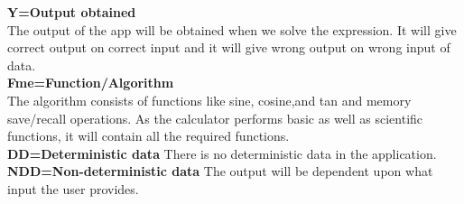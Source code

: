 \documentclass[a4paper,12pt]{article}
\begin{document}
\textbf{Y=Output obtained}\\

  The output of the app will be obtained when we solve the expression. It will give correct output on correct input and it will give wrong output on wrong input of data.
 \\

\textbf{Fme=Function/Algorithm}\\

The algorithm consists of functions like sine, cosine,and tan and memory save/recall operations. As the calculator performs basic as well as scientific functions, it will contain all the required functions.
\\

\textbf{DD=Deterministic data}
There is no deterministic data in the application.
\\

\textbf{NDD=Non-deterministic data}
The output will be dependent upon what input the user provides. 
\\
\end{document}

